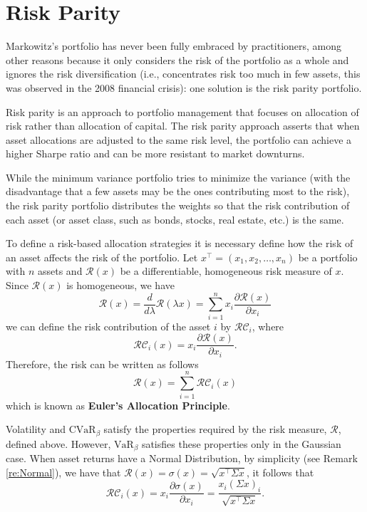 \section{Risk Parity}

Markowitz’s portfolio has never been fully embraced by practitioners, among other reasons because it only considers the risk of the portfolio as a whole and ignores the risk diversification (i.e., concentrates risk too much in few assets, this was observed in the 2008 financial crisis): one solution is the risk parity portfolio.

Risk parity is an approach to portfolio management that focuses on allocation of risk rather than allocation of capital. The risk parity approach asserts that when asset allocations are adjusted to the same risk level, the portfolio can achieve a higher Sharpe ratio and can be more resistant to market downturns.

While the minimum variance portfolio tries to minimize the variance (with the disadvantage that a few assets may be the ones contributing most to the risk), the risk parity portfolio distributes the weights so that the risk contribution of each asset (or asset class, such as bonds, stocks, real estate, etc.) is the same.

To define a risk-based allocation strategies it is necessary define how the risk of an asset affects the risk of the portfolio. 
Let $x^\top=(x_1,x_2,\dots,x_n)$ be a portfolio with $n$ assets and $\mathcal{R}(x)$ be a differentiable, homogeneous risk measure of $x$. Since $\mathcal{R}(x)$ is homogeneous, we have
\[
\mathcal{R}(x)=\frac{d}{d\lambda}\mathcal{R}(\lambda x)=\sum_{i=1}^n x_i \frac{\partial \mathcal{R} (x)}{\partial x_i}
\]
we can define the risk contribution of the asset $i$ by
$\mathcal{RC}_i$, where
\[
\mathcal{RC}_i(x)= x_i \frac{\partial \mathcal{R}(x)}{\partial x_i}.
\]
Therefore, the risk can be written as follows
\[
\mathcal{R}(x)=\sum_{i=1}^n \mathcal{RC}_i(x)
\]
which is known as \textbf{Euler's Allocation Principle}.

Volatility and $\mbox{CVaR}_\beta$  satisfy the properties required by the risk measure, $\mathcal{R}$, defined above. However, $\mbox{VaR}_\beta$ satisfies these properties only in the Gaussian case. When asset returns have a Normal Distribution, by simplicity (see Remark \ref{re:Normal}), we have that
$\mathcal{R}(x)=\sigma(x)=\sqrt{x^\top\Sigma x}$, it follows that
\[
\mathcal{RC}_i(x)= x_i \frac{\partial \sigma(x)}{\partial x_i}=\frac{x_i (\Sigma x)_i}{\sqrt{x^\top\Sigma x }}.
\]

